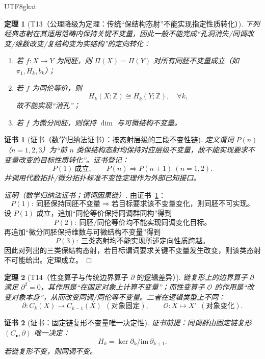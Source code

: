 \documentclass[12pt]{article}
\newtheorem{theorem}{定理}[section]
\newtheorem{Certificate}{证书}[section]
\begin{document}
\begin{CJK*}{UTF8}{gkai}
\begin{theorem}[T13（公理降级为定理：传统“保结构态射”不能实现指定性质转化）]
\label{thm:T13}
下列经典态射在其适用范畴内保持关键不变量，因此一般不能完成“孔洞消失/同调改变/维数改变/复结构变为实结构”的定向转化：
\begin{enumerate}
\item 若 $f:X\to Y$ 为同胚，则 $\Pi(X)=\Pi(Y)$ 对所有同胚不变量成立（如 $\pi_1,H_k,b_k$）；
\item 若 $f$ 为同伦等价，则
\[
H_k(X;\mathbb Z)\cong H_k(Y;\mathbb Z),\quad \forall k,
\]
故不能实现“消孔”；
\item 若 $f$ 为微分同胚，则保持 $\dim$ 与可微结构不变量。
\end{enumerate}
\end{theorem}

\begin{Certificate}[证书（数学归纳法证书）：按态射层级的三段不变性链]
\label{cert:T13}
定义谓词 $P(n)$（$n=1,2,3$）为“前 $n$ 类保结构态射均保持对应层级不变量，故不能实现要求不变量改变的目标性质转化”。证书登记：
\[
P(1)\ \text{成立},\qquad P(n)\Rightarrow P(n+1)\ (n=1,2).
\]
并调用代数拓扑/微分拓扑标准不变性定理作为外部已知接口。
\end{Certificate}

\begin{proof}[证明（数学归纳法证书；谓词因果链）]
由证书~\ref{cert:T13}：
\[
P(1):\ \text{同胚保持同胚不变量}
\Rightarrow
\text{若目标要求该不变量变化，则同胚不可实现。}
\]
设 $P(1)$ 成立，追加“同伦等价保持同调群同构”得到
\[
P(2):\ \text{同胚/同伦等价均不能实现同调变化目标。}
\]
再追加“微分同胚保持维数与可微结构不变量”得到
\[
P(3):\ \text{三类态射均不能实现所述定向性质跨越。}
\]
因此对列出的三类保结构态射，若目标谓词要求关键不变量发生改变，则该类态射不可能给出。定理成立。
\end{proof}

\begin{theorem}[T14（性变算子与传统边界算子 $\partial$ 的逻辑差异）]
\label{thm:T14}
链复形上的边界算子 $\partial$ 满足 $\partial^2=0$，其作用是“在固定对象上计算不变量”；而性变算子 $\mathcal O$ 的作用是“改变对象本身”，从而改变同调/同伦等不变量。二者在逻辑类型上不同：
\[
\partial: C_k(X)\to C_{k-1}(X)\ \ (\text{对象固定}),
\qquad
\mathcal O: X\mapsto X'\ \ (\text{对象变化}).
\]
\end{theorem}

\begin{Certificate}[证书：固定链复形不变量唯一决定性]
\label{cert:T14}
证书前提：同调群由固定链复形 $(C_\bullet,\partial)$ 唯一决定：
\[
H_k=\ker\partial_k/\mathrm{im}\,\partial_{k+1}.
\]
若链复形不变，则同调不变。
\end{Certificate}


\end{CJK*}
\end{document}
